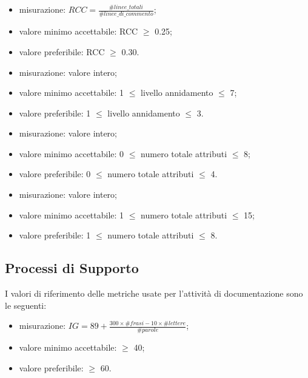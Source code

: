 			\begin{itemize}
				\item{misurazione: $RCC = \displaystyle\frac{\#linee\_totali}{\#linee\_di\_commento} $;}
				\item{valore minimo accettabile: RCC $\geq$ 0.25;}
				\item{valore preferibile: RCC $\geq$ 0.30.}
			\end{itemize}

			\begin{itemize}
				\item{misurazione: valore intero;}
				\item{valore minimo accettabile: 1 $\leq$ livello annidamento $\leq$ 7;}
				\item{valore preferibile: 1 $\leq$ livello annidamento $\leq$ 3.}
			\end{itemize}
			
			\begin{itemize}
				\item{misurazione: valore intero;}
				\item{valore minimo accettabile: 0 $\leq$ numero totale attributi $\leq$ 8;}
				\item{valore preferibile: 0 $\leq$ numero totale attributi $\leq$ 4.}
			\end{itemize}
			
			\begin{itemize}
				\item{misurazione: valore intero;}
				\item{valore minimo accettabile: 1 $\leq$ numero totale attributi $\leq$ 15;}
				\item{valore preferibile: 1 $\leq$ numero totale attributi $\leq$ 8.}
			\end{itemize}

\subsection{Processi di Supporto}

	I valori di riferimento delle metriche usate per l'attività di documentazione sono le seguenti:
	
			 \begin{itemize}
				\item{misurazione: $ IG=89+\frac{300 \times \#frasi -10\times \#lettere}{\#parole} $;}
				\item{valore minimo accettabile: $\geq$ 40;}
				\item{valore preferibile: $\geq$ 60.}
			\end{itemize}

